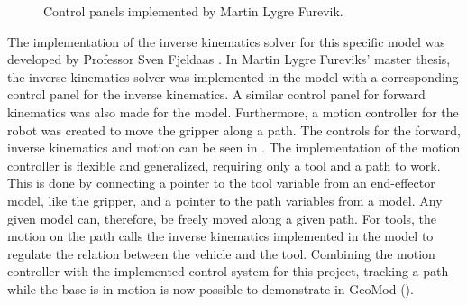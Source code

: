 \begin{figure}[ht]
  \centering
  \hfill
  \hfill
  \caption[Control panels implemented by Martin Lygre Furevik]{Control panels implemented by Martin Lygre Furevik.}
  \label{fig:martincontrolpanels}
\end{figure}

The implementation of the inverse kinematics solver for this specific model was developed by Professor Sven Fjeldaas \cite{sven}. In Martin Lygre Fureviks' master thesis, the inverse kinematics solver was implemented in the model with a corresponding control panel for the inverse kinematics. A similar control panel for forward kinematics was also made for the model. Furthermore, a motion controller for the robot was created to move the gripper along a path. The controls for the forward, inverse kinematics and motion can be seen in . The implementation of the motion controller is flexible and generalized, requiring only a tool and a path to work. This is done by connecting a pointer to the tool variable from an end-effector model, like the gripper, and a pointer to the path variables from a model. Any given model can, therefore, be freely moved along a given path. For tools, the motion on the path calls the inverse kinematics implemented in the model to regulate the relation between the vehicle and the tool. Combining the motion controller with the implemented control system for this project, tracking a path while the base is in motion is now possible to demonstrate in GeoMod (). 


